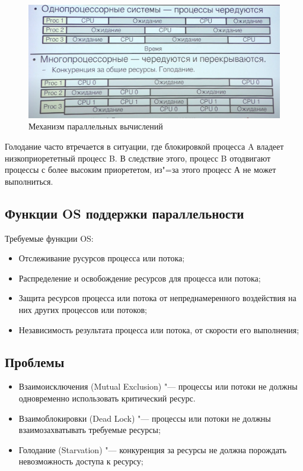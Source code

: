 \documentclass[bachelor, och, book]{SCWorks}
\theoremstyle{remark}
\begin{document}
    \begin{figure}[H]
        \begin{center}
            \includegraphics[scale=0.40]{res/Parallel-Computing-Mechanism.png}
            \caption{Механизм параллельных вычислений}
        \end{center}
    \end{figure}

    Голодание часто втречается в ситуации, где блокировкой процесса A владеет низкоприорететный процесс B. В следствие этого, процесс B отодвигают процессы с более высоким приорететом, из"=за этого процесс А не может выполниться.


    \subsection{Функции OS поддержки параллельности}
    Требуемые функции OS:

    \begin{itemize}[label=$\bullet$]
        \item Отслеживание русурсов процесса или потока;
        \item Распределение и освобождение ресурсов для процесса или потока;
        \item Защита ресурсов процесса или потока от непреднамеренного воздействия на них других процессов или потоков;
        \item Независимость результата процесса или потока, от скорости его выполнения;
    \end{itemize}

    \subsection{Проблемы}

    \begin{itemize}[label=$\bullet$]
        \item Взаимоисключения (Mutual Exclusion) "--- процессы или потоки не должны одновременно использовать критический ресурс.
        \item Взаимоблокировки (Dead Lock) "--- процессы или потоки не должны взаимозахватывать требуемые ресурсы;
        \item Голодание (Starvation) "--- конкуренция за ресурсы не должна порождать невозможность доступа к ресурсу;
    \end{itemize}
\end{document}

